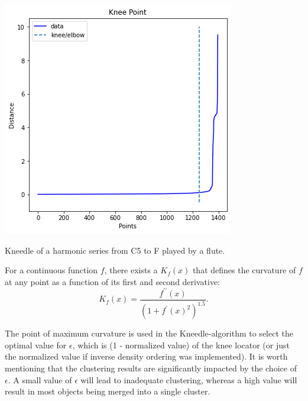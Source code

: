 \begin{marginfigure}
\vspace{2cm}
\includegraphics[width=1\linewidth]{images/cluster/kneePoint.png}
\caption{Kneedle of a harmonic series from C5 to F played by a flute.}
\label{fig:kneedle} 
\end{marginfigure}

\begin{definition}[Kneedle]
For a continuous function $f$, there exists a $K_f(x)$ that defines the curvature of $f$ at any point as a function of its first and second derivative:
\begin{equation}
K_f(x)=\frac{f^{\prime \prime}(x)}{\left(1+f^{\prime}(x)^2\right)^{1.5}}.
\end{equation}
\end{definition}

The point of maximum curvature is used in the Kneedle-algorithm to select the optimal value for $\epsilon$, which is (1 - normalized value) of the knee locator (or just the normalized value if inverse density ordering was implemented). It is worth mentioning that the clustering results are significantly impacted by the choice of $\epsilon$. A small value of $\epsilon$ will lead to inadequate clustering, whereas a high value will result in most objects being merged into a single cluster.


